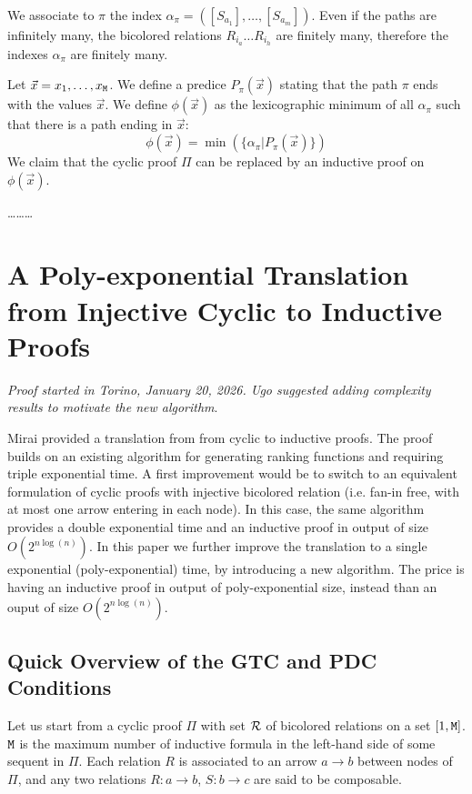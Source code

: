 \documentclass{lmcs}
\begin{document}
We associate to $\pi$ the index $\alpha_\pi = ([S_{a_1}], \ldots, [S_{a_m}])$. 
Even if the paths are infinitely many,
the bicolored relations $R_{i_a} \ldots  R_{i_h}$ are finitely many, therefore the
indexes $\alpha_\pi$ are finitely many.

Let $\vec{x} = x_1, \ldots, x_{{\tt M}}$.
We define a predice $P_\pi(\vec{x})$ stating that the path $\pi$ ends with the
values $\vec{x}$. We define 
$\phi(\vec{x})$ as the lexicographic minimum  
of all $\alpha_\pi$ such that there is a path ending in $\vec{x}$:
$$
\phi(\vec{x}) 
= 
\min(\{\alpha_\pi | P_\pi(\vec{x})\})
$$ 
We claim that the cyclic proof $\Pi$ can be replaced by an inductive proof on $\phi(\vec{x})$.

\ldots\ldots\ldots


\newpage

\section{A Poly-exponential Translation from Injective Cyclic to Inductive Proofs}
\emph{Proof started in Torino, January 20, 2026. 
Ugo suggested adding complexity results to motivate the new algorithm}.

Mirai \cite{} provided a translation from from cyclic to inductive proofs. The proof builds
on an existing algorithm for generating ranking functions and 
requiring triple exponential time. A first improvement would be to switch to an equivalent
formulation of cyclic proofs with injective bicolored relation (i.e. fan-in free, with at most one
arrow entering in each node). In this case, the same algorithm provides a double exponential
time \cite{} and an inductive proof in output of size $O(2^{n \log(n)})$.
In this paper we further improve the translation to a single exponential (poly-exponential) time, 
by introducing a new algorithm. The price is having an inductive proof in output
of poly-exponential size, instead than an ouput of size $O(2^{n \log(n)})$.


\subsection{Quick Overview of the GTC and PDC Conditions}
Let us start from a cyclic proof $\Pi$ with set ${\mathcal R}$ of bicolored relations on a set 
$[1,{\tt M}]$. ${\tt M}$ is the maximum number of inductive formula in the left-hand side 
of some sequent in $\Pi$. Each relation $R$ is associated to an arrow $a \rightarrow b$ 
between nodes of $\Pi$, and any two relations $R:a \rightarrow b$, $S:b \rightarrow c$
are said to be composable.
 
\end{document}

